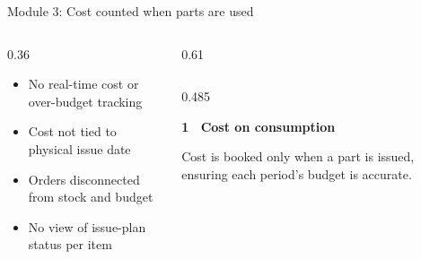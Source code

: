 \begin{frame}{Module 3: Cost counted when parts are used}
    \vspace{0.15cm}
    
    \begin{columns}[T]
        \begin{column}{0.36\textwidth}
            \begin{beforebox}[height=5.0cm, title={\textbf{TODAY}}]
                {\fontsize{7.8}{11}\selectfont\color{darkslate}
                \begin{itemize}\setlength{\itemsep}{6pt}\setlength{\leftmargin}{10pt}
                    \item[\textcolor{problemtext}{\textbullet}] No real-time cost or over-budget tracking
                    \item[\textcolor{problemtext}{\textbullet}] Cost not tied to physical issue date
                    \item[\textcolor{problemtext}{\textbullet}] Orders disconnected from stock and budget
                    \item[\textcolor{problemtext}{\textbullet}] No view of issue-plan status per item
                \end{itemize}
                }
            \end{beforebox}
        \end{column}
        
        \begin{column}{0.61\textwidth}
            \begin{columns}[T]
                \begin{column}{0.485\textwidth}
                    \begin{minimalcard}[height=2.4cm]
                        {\fontsize{8}{10}\bfseries\selectfont\color{primary}1 \textbullet\ Cost on consumption}\par
                        \vspace{0.15cm}
                        {\fontsize{7.2}{9.5}\selectfont\color{mutedgray}
                        Cost is booked only when a part is issued, ensuring each period's budget is accurate.
                        }
                    \end{minimalcard}
                \end{column}
                

\end{columns}
\end{column}
\end{columns}
\end{frame}
